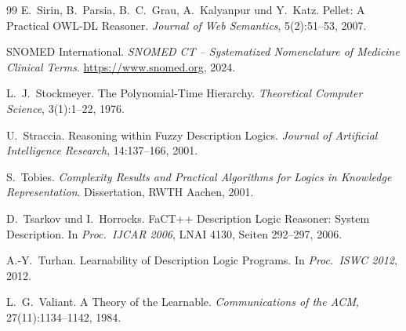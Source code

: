 ﻿\documentclass[a4paper,12pt]{article}
\theoremstyle{definition}
\theoremstyle{plain}
\theoremstyle{remark}
\begin{document}
\begin{thebibliography}{99}
E.~Sirin, B.~Parsia, B.~C.~Grau, A.~Kalyanpur und Y.~Katz.
Pellet: A Practical OWL-DL Reasoner.
\textit{Journal of Web Semantics}, 5(2):51--53, 2007.

SNOMED International.
\textit{SNOMED CT -- Systematized Nomenclature of Medicine
Clinical Terms}.
\url{https://www.snomed.org}, 2024.

L.~J.~Stockmeyer.
The Polynomial-Time Hierarchy.
\textit{Theoretical Computer Science}, 3(1):1--22, 1976.

U.~Straccia.
Reasoning within Fuzzy Description Logics.
\textit{Journal of Artificial Intelligence Research},
14:137--166, 2001.

S.~Tobies.
\textit{Complexity Results and Practical Algorithms for
Logics in Knowledge Representation}.
Dissertation, RWTH Aachen, 2001.

D.~Tsarkov und I.~Horrocks.
FaCT++ Description Logic Reasoner: System Description.
In \textit{Proc.\ IJCAR 2006}, LNAI 4130, Seiten 292--297, 2006.

A.-Y.~Turhan.
Learnability of Description Logic Programs.
In \textit{Proc.\ ISWC 2012}, 2012.

L.~G.~Valiant.
A Theory of the Learnable.
\textit{Communications of the ACM}, 27(11):1134--1142, 1984.

\end{thebibliography}
\end{document}
